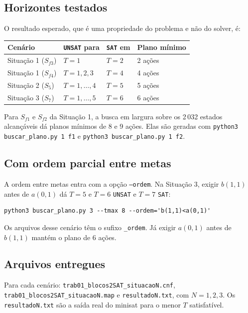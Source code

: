 \subsection{Horizontes testados}
O resultado esperado, que é uma propriedade do problema e não do solver, é:
\begin{center}
\begin{tabular}{l l l l}
\toprule
Cenário & \texttt{UNSAT} para & \texttt{SAT} em & Plano mínimo \\
\midrule
Situação 1 ($S_{f3}$) & $T=1$ & $T=2$ & 2 ações \\
Situação 1 ($S_{f4}$) & $T=1,2,3$ & $T=4$ & 4 ações \\
Situação 2 ($S_5$) & $T=1,\dots,4$ & $T=5$ & 5 ações \\
Situação 3 ($S_7$) & $T=1,\dots,5$ & $T=6$ & 6 ações \\
\bottomrule
\end{tabular}
\end{center}
Para $S_{f1}$ e $S_{f2}$ da Situação 1, a busca em largura sobre os 2\,032 estados alcançáveis dá planos mínimos de 8 e 9 ações. Elas são geradas com \texttt{python3 buscar\_plano.py 1 f1} e \texttt{python3 buscar\_plano.py 1 f2}.

\subsection{Com ordem parcial entre metas}
A ordem entre metas entra com a opção \texttt{--ordem}. Na Situação 3, exigir $b(1,1)$ antes de $a(0,1)$ dá $T=5$ e $T=6$ \texttt{UNSAT} e $T=7$ \texttt{SAT}:
\begin{lstlisting}
python3 buscar_plano.py 3 --tmax 8 --ordem='b(1,1)<a(0,1)'
\end{lstlisting}
Os arquivos desse cenário têm o sufixo \texttt{\_ordem}. Já exigir $a(0,1)$ antes de $b(1,1)$ mantém o plano de 6 ações.

\subsection{Arquivos entregues}
Para cada cenário: \texttt{trab01\_blocos2SAT\_situacaoN.cnf}, \texttt{trab01\_blocos2SAT\_situacaoN.map} e \texttt{resultadoN.txt}, com $N=1,2,3$. Os \texttt{resultadoN.txt} são a saída real do minisat para o menor $T$ satisfatível.
